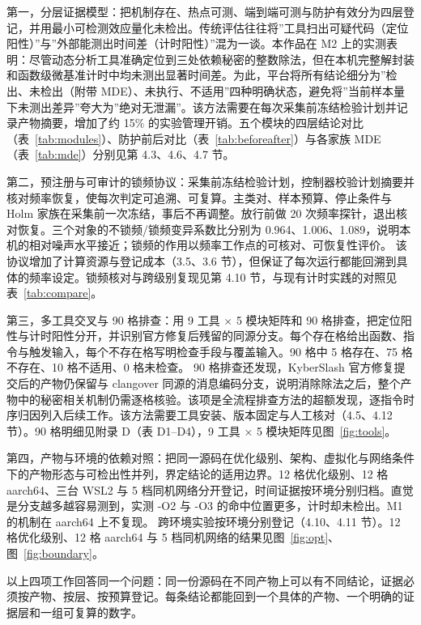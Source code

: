 第一，分层证据模型：把机制存在、热点可测、端到端可测与防护有效分为四层登记，并用最小可检测效应量化未检出。传统评估往往将”工具扫出可疑代码（定位阳性）”与”外部能测出时间差（计时阳性）”混为一谈。本作品在 M2 上的实测表明：尽管动态分析工具准确定位到三处依赖秘密的整数除法，但在本机完整解封装和函数级微基准计时中均未测出显著时间差。为此，平台将所有结论细分为”检出、未检出（附带 MDE）、未执行、不适用”四种明确状态，避免将”当前样本量下未测出差异”夸大为”绝对无泄漏”。该方法需要在每次采集前冻结检验计划并记录产物摘要，增加了约 15\% 的实验管理开销。五个模块的四层结论对比（表~\ref{tab:modules}）、防护前后对比（表~\ref{tab:beforeafter}）与各家族 MDE（表~\ref{tab:mde}）分别见第 4.3、4.6、4.7 节。

第二，预注册与可审计的锁频协议：采集前冻结检验计划，控制器校验计划摘要并核对频率恢复，使每次判定可追溯、可复算。主类对、样本预算、停止条件与 Holm 家族在采集前一次冻结，事后不再调整。放行前做 20 次频率探针，退出核对恢复。三个对象的不锁频/锁频变异系数比分别为 0.964、1.006、1.089，说明本机的相对噪声水平接近；锁频的作用以频率工作点的可核对、可恢复性评价。%
该协议增加了计算资源与登记成本（3.5、3.6 节），但保证了每次运行都能回溯到具体的频率设定。锁频核对与跨级别复现见第 4.10 节，与现有计时实践的对照见表~\ref{tab:compare}。

第三，多工具交叉与 90 格排查：用 9 工具 $\times$ 5 模块矩阵和 90 格排查，把定位阳性与计时阳性分开，并识别官方修复后残留的同源分支。每个存在格给出函数、指令与触发输入，每个不存在格写明检查手段与覆盖输入。90 格中 5 格存在、75 格不存在、10 格不适用、0 格未检查。%
90 格排查还发现，KyberSlash 官方修复提交后的产物仍保留与 clangover 同源的消息编码分支，说明消除除法之后，整个产物中的秘密相关机制仍需逐格核验。该项是全流程排查方法的超额发现，逐指令时序归因列入后续工作。该方法需要工具安装、版本固定与人工核对（4.5、4.12 节）。90 格明细见附录 D（表 D1--D4），9 工具 × 5 模块矩阵见图~\ref{fig:tools}。

第四，产物与环境的依赖对照：把同一源码在优化级别、架构、虚拟化与网络条件下的产物形态与可检出性并列，界定结论的适用边界。12 格优化级别、12 格 aarch64、三台 WSL2 与 5 档同机网络分开登记，时间证据按环境分别归档。直觉是分支越多越容易测到，实测 -O2 与 -O3 的命中位置更多，计时却未检出。M1 的机制在 aarch64 上不复现。%
跨环境实验按环境分别登记（4.10、4.11 节）。12 格优化级别、12 格 aarch64 与 5 档同机网络的结果见图~\ref{fig:opt}、图~\ref{fig:boundary}。

以上四项工作回答同一个问题：同一份源码在不同产物上可以有不同结论，证据必须按产物、按层、按预算登记。每条结论都能回到一个具体的产物、一个明确的证据层和一组可复算的数字。

